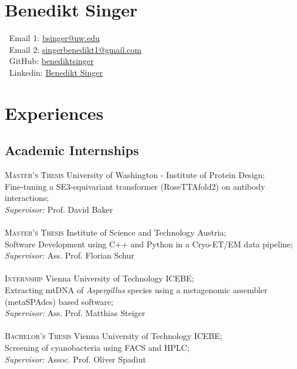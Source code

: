 \documentclass[14pt]{article} %
\begin{document}
\section*{\Huge{Benedikt Singer}}

 $\:$ Email 1: \href{mailto:bsinger@uw.edu}{bsinger@uw.edu}\\
 $\:$ Email 2: \href{mailto:singerbenedikt1@gmail.com}{singerbenedikt1@gmail.com}\\
 $\:$ GitHub: \href{https://github.com/benediktsinger}{benediktsinger}\\
 $\:$ Linkedin: \href{https://www.linkedin.com/in/benedikt-singer-521689281}{Benedikt Singer}


\section*{Experiences}

\subsection*{Academic Internships}

\textsc{Master's Thesis} University of Washington - Institute of Protein Design; \\Fine-tuning a SE3-equivariant transformer (RoseTTAfold2) on antibody interactions; \\
\textit{Supervisor:} Prof. David Baker\\
\\
\textsc{Master's Thesis} Institute of Science and Technology Austria; \\Software Development using C++ and Python in a Cryo-ET/EM data pipeline; \\
\textit{Supervisor:} Ass. Prof. Florian Schur\\
\\
\textsc{Internship} Vienna University of Technology ICEBE;\\ Extracting mtDNA of \textit{Aspergillus} species using a metagenomic assembler (metaSPAdes) based software; \\
\textit{Supervisor:} Ass. Prof. Matthias Steiger\\
\\
\textsc{Bachelor's Thesis} Vienna University of Technology ICEBE; \\Screening of cyanobacteria using FACS and HPLC; \\
\textit{Supervisor:} Assoc. Prof. Oliver Spadiut
\end{document}
